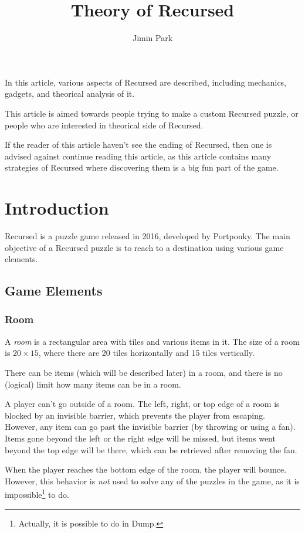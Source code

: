 \documentclass[a4paper]{article}
\theoremstyle{definition}
\begin{document}
\title{Theory of Recursed}
\author{Jimin Park}
\maketitle

In this article, various aspects of Recursed are described, including mechanics,
gadgets, and theorical analysis of it.

This article is aimed towards people trying to make a custom Recursed puzzle,
or people who are interested in theorical side of Recursed.

If the reader of this article haven't see the ending of Recursed, then one is advised against continue reading this article,
as this article contains many strategies of Recursed where discovering them is a big fun part of the game.

\tableofcontents

\section{Introduction}
Recursed is a puzzle game released in 2016, developed by Portponky.
The main objective of a Recursed puzzle is to reach to a destination using various game elements.

\subsection{Game Elements}

\subsubsection{Room}
A \emph{room} is a rectangular area with tiles and various items in it.
The size of a room is $20\times15$, where there are 20 tiles horizontally and 15 tiles vertically.

There can be items (which will be described later) in a room, and there is no (logical) limit how many items
can be in a room.

A player can't go outside of a room. The left, right, or top edge of a room is blocked by an invisible barrier,
which prevents the player from escaping. However, any item can go past the invisible barrier (by throwing or using a fan).
Items gone beyond the left or the right edge will be missed, but items went beyond the top edge will be there, which can be
retrieved after removing the fan.

When the player reaches the bottom edge of the room, the player will bounce.
However, this behavior is \emph{not} used to solve any of the puzzles in the game,
as it is impossible\footnote{Actually, it is possible to do in Dump.} to do.
\end{document}
